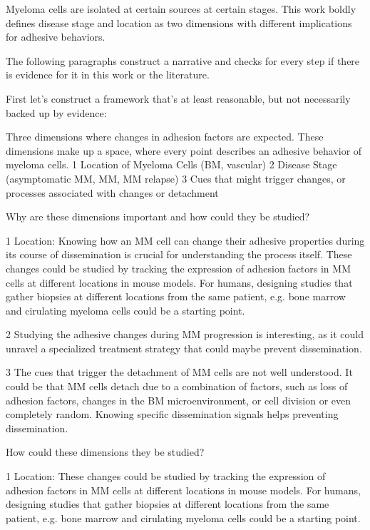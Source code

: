 Myeloma cells are isolated at certain sources at certain stages. This work
boldly defines disease stage and location as two dimensions with different implications
for adhesive behaviors.

The following paragraphs construct a narrative and checks for every step if there is
evidence for it in this work or the literature.

First let's construct a framework that's at least reasonable, but not necessarily
backed up by evidence:

Three dimensions where changes in adhesion factors are expected. These dimensions
make up a space, where every point describes an adhesive behavior of myeloma cells.
1 Location of Myeloma Cells (BM, vascular)
2 Disease Stage (asymptomatic MM, MM, MM relapse)
3 Cues that might trigger changes, or processes associated with changes or detachment

Why are these dimensions important and how could they be studied?

1 Location: Knowing how an MM cell can change their adhesive properties during its course of
dissemination is crucial for understanding the process itself. These changes
could be studied by tracking the expression of adhesion factors in MM cells at
different locations in mouse models. For humans, designing studies that gather
biopsies at different locations from the same patient, e.g. bone marrow and cirulating
myeloma cells could be a starting point.

2 Studying the adhesive changes during MM progression is
interesting, as it could unravel a specialized treatment strategy
that could maybe prevent dissemination.

3 The cues that trigger the detachment of MM cells are not well understood. It
could be that MM cells detach due to a combination of factors, such as loss of
adhesion factors, changes in the BM microenvironment, or cell division or
even completely random. Knowing specific dissemination signals helps preventing
dissemination.


How could these dimensions they be studied?

1 Location: These changes could be studied by tracking the expression of adhesion factors in MM cells at
different locations in mouse models. For humans, designing studies that gather
biopsies at different locations from the same patient, e.g. bone marrow and cirulating
myeloma cells could be a starting point.

